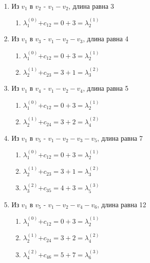 \documentclass{article}
\newcommand\ld[2]{$\lambda^{(#1)}_{#2}$}
\begin{document}
\\
\begin{enumerate}
\item Из $v_1$ в $v_2$ - $v_1 - v_2$, длина равна 3
\begin{enumerate}
    \item \ld{0}{1}$+ c_{12} = 0 + 3 =$\ld{1}{2}
\end{enumerate}

\item Из $v_1$ в $v_3$ - $v_1 - v_2 - v_3$, длина равна 4
\begin{enumerate}
    \item \ld{0}{1}$+ c_{12} = 0 + 3 =$\ld{1}{2}
    \item \ld{1}{2}$+ c_{23} = 3 + 1 =$\ld{2}{3}
\end{enumerate}

\item Из $v_1$ в $v_4$ - $v_1 - v_2 - v_4$, длина равна 5
\begin{enumerate}
    \item \ld{0}{1}$+ c_{12} = 0 + 3 =$\ld{1}{2}
    \item \ld{1}{2}$+ c_{24} = 3 + 2 =$\ld{2}{4}
\end{enumerate}

\item Из $v_1$ в $v_5$ - $v_1 - v_2 - v_3 - v_5$, длина равна 7
\begin{enumerate}
    \item \ld{0}{1}$+ c_{12} = 0 + 3 =$\ld{1}{2}
    \item \ld{1}{2}$+ c_{23} = 3 + 1 =$\ld{2}{3}
    \item \ld{2}{3}$+ c_{35} = 4 + 3 =$\ld{3}{5}
\end{enumerate}

\item Из $v_1$ в $v_5$ - $v_1 - v_2 - v_4 - v_6$, длина равна 12
\begin{enumerate}
    \item \ld{0}{1}$+ c_{12} = 0 + 3 =$\ld{1}{2}
    \item \ld{1}{2}$+ c_{24} = 3 + 2 =$\ld{2}{4}
    \item \ld{2}{4}$+ c_{46} = 5 + 7 =$\ld{3}{6}
\end{enumerate}


\end{enumerate}
\end{document}

